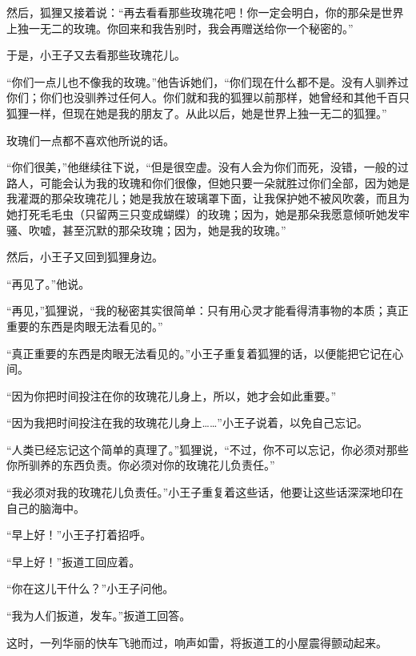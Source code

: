 然后，狐狸又接着说：“再去看看那些玫瑰花吧！你一定会明白，你的那朵是世界上独一无二的玫瑰。你回来和我告别时，我会再赠送给你一个秘密的。”

于是，小王子又去看那些玫瑰花儿。

“你们一点儿也不像我的玫瑰。”他告诉她们，“你们现在什么都不是。没有人驯养过你们；你们也没驯养过任何人。你们就和我的狐狸以前那样，她曾经和其他千百只狐狸一样，但现在她是我的朋友了。从此以后，她是世界上独一无二的狐狸。”

玫瑰们一点都不喜欢他所说的话。

“你们很美，”他继续往下说，“但是很空虚。没有人会为你们而死，没错，一般的过路人，可能会认为我的玫瑰和你们很像，但她只要一朵就胜过你们全部，因为她是我灌溉的那朵玫瑰花儿；她是我放在玻璃罩下面，让我保护她不被风吹袭，而且为她打死毛毛虫（只留两三只变成蝴蝶）的玫瑰；因为，她是那朵我愿意倾听她发牢骚、吹嘘，甚至沉默的那朵玫瑰；因为，她是我的玫瑰。”

然后，小王子又回到狐狸身边。

“再见了。”他说。

“再见，”狐狸说，“我的秘密其实很简单：只有用心灵才能看得清事物的本质；真正重要的东西是肉眼无法看见的。”

“真正重要的东西是肉眼无法看见的。”小王子重复着狐狸的话，以便能把它记在心间。

“因为你把时间投注在你的玫瑰花儿身上，所以，她才会如此重要。”

“因为我把时间投注在我的玫瑰花儿身上\ldots{}\ldots{}”小王子说着，以免自己忘记。

“人类已经忘记这个简单的真理了。”狐狸说，“不过，你不可以忘记，你必须对那些你所驯养的东西负责。你必须对你的玫瑰花儿负责任。”

{\startalignment[center]
 \stopalignment}

“我必须对我的玫瑰花儿负责任。”小王子重复着这些话，他要让这些话深深地印在自己的脑海中。


\stoptitle

\starttitle[title={22}]

“早上好！”小王子打着招呼。

“早上好！”扳道工回应着。

“你在这儿干什么？”小王子问他。

“我为人们扳道，发车。”扳道工回答。

这时，一列华丽的快车飞驰而过，响声如雷，将扳道工的小屋震得颤动起来。

